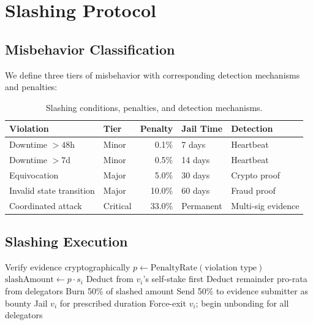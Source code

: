 \section{Slashing Protocol}
\label{sec:slashing}

\subsection{Misbehavior Classification}

We define three tiers of misbehavior with corresponding detection mechanisms and penalties:

\begin{table}[H]
\centering
\caption{Slashing conditions, penalties, and detection mechanisms.}
\label{tab:slashing}
\begin{tabular}{p{3cm}lrll}
\toprule
\textbf{Violation} & \textbf{Tier} & \textbf{Penalty} & \textbf{Jail Time} & \textbf{Detection} \\
\midrule
Downtime $> 48$h & Minor & 0.1\% & 7 days & Heartbeat \\
Downtime $> 7$d & Minor & 0.5\% & 14 days & Heartbeat \\
Equivocation & Major & 5.0\% & 30 days & Crypto proof \\
Invalid state transition & Major & 10.0\% & 60 days & Fraud proof \\
Coordinated attack & Critical & 33.0\% & Permanent & Multi-sig evidence \\
\bottomrule
\end{tabular}
\end{table}

\subsection{Slashing Execution}

\begin{algorithm}[H]
\caption{Slashing Execution Protocol}
\label{alg:slashing}
\begin{algorithmic}[1]
    \State Verify evidence cryptographically
    \State $p \gets \text{PenaltyRate}(\text{violation type})$
    \State $\text{slashAmount} \gets p \cdot s_i$
    \State Deduct from $v_i$'s self-stake first
        \State Deduct remainder pro-rata from delegators
    \EndIf
    \State Burn 50\% of slashed amount
    \State Send 50\% to evidence submitter as bounty
    \State Jail $v_i$ for prescribed duration
        \State Force-exit $v_i$; begin unbonding for all delegators
    \EndIf
\EndProcedure
\end{algorithmic}
\end{algorithm}

